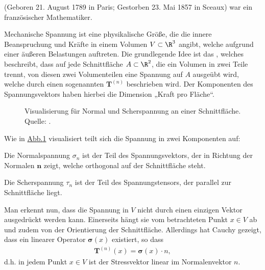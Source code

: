 \documentclass[letterpaper,10pt,german]{jupyterBook}
\let\sphinxpxdimen\pdfpxdimen\else\newdimen\sphinxpxdimen
\begin{document}
\begin{sphinxShadowBox}

\sphinxAtStartPar
{} (Geboren 21. August 1789 in Paris; Gestorben 23. Mai 1857 in Sceaux) war ein französischer Mathematiker.
\end{sphinxShadowBox}

\sphinxAtStartPar
Mechanische Spannung ist eine physikalische Größe, die die innere Beanspruchung und Kräfte in einem Volumen \(V\subset\R^3\) angibt, welche aufgrund einer äußeren Belastungen auftreten.
Die grundlegende Idee ist das , welches beschreibt, dass auf jede Schnittfläche \(A\subset\R^2\), die ein Volumen in zwei Teile trennt, von diesen zwei Volumenteilen eine Spannung auf \(A\) ausgeübt wird, welche durch einen sogenannten  \(\mathbf{T}^{(n)}\) beschrieben wird.
Der Komponenten des Spannungsvektors haben hierbei die Dimension „Kraft pro Fläche“.

\begin{figure}[htbp]
\centering
\capstart

\noindent\sphinxincludegraphics[height=250\sphinxpxdimen]{{stress_vector}.png}
\caption{Visualisierung für Normal\sphinxhyphen{} und Scherspannung an einer Schnittfläche. Quelle: .}\label{\detokenize{vektoranalysis/tensor:fig-stress}}\end{figure}

\sphinxAtStartPar
Wie in \hyperref[\detokenize{vektoranalysis/tensor:fig-stress}]{Abb.\@ \ref{\detokenize{vektoranalysis/tensor:fig-stress}}} visualisiert teilt sich die Spannung in zwei Komponenten auf:

\sphinxAtStartPar
{}

\sphinxAtStartPar
Die Normalspannung \(\sigma_n\) ist der Teil des Spannungsvektors, der in Richtung der Normalen \(\mathbf{n}\) zeigt, welche orthogonal auf der Schnittfläche steht.

\sphinxAtStartPar
{}

\sphinxAtStartPar
Die Scherspannung \(\tau_n\) ist der Teil des Spannungstensors, der parallel zur Schnittfläche liegt.

\sphinxAtStartPar
Man erkennt nun, dass die Spannung in \(V\) nicht durch einen einzigen Vektor ausgedrückt werden kann. Einerseits hängt sie vom betrachteten Punkt \(x\in V\) ab und zudem von der Orientierung der Schnittfläche. Allerdings hat Cauchy gezeigt, dass ein linearer Operator \(\mathbf{\sigma}(x)\) existiert, so dass
\begin{equation*}
\begin{split}\mathbf{T}^{(n)}(x) = \mathbf{\sigma}(x) \cdot n,\end{split}
\end{equation*}
\sphinxAtStartPar
d.h. in jedem Punkt \(x\in V\) ist der Stressvektor linear im Normalenvektor \(n\).
\end{document}
